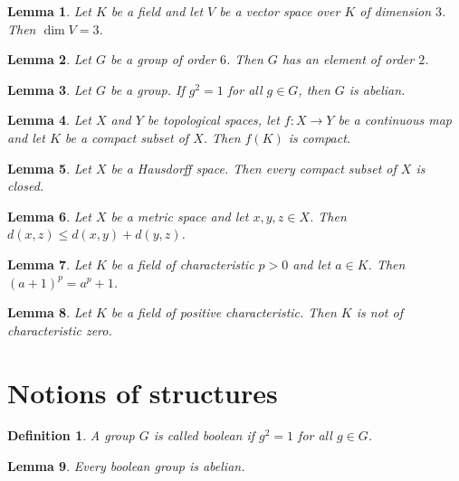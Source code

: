 \documentclass{article}
\newtheorem{lemma}{Lemma}
\newtheorem{definition}{Definition}
\begin{document}
\begin{lemma}\label{dimension}
Let $K$ be a field and let $V$ be a vector space over $K$ of dimension $3$. Then $\dim V=3$.
\end{lemma}

\begin{lemma}\label{element-of-order-two}
Let $G$ be a group of order $6$. Then $G$ has an element of order $2$.
\end{lemma}

\begin{lemma}\label{exponent-two}
Let $G$ be a group. If $g^2=1$ for all $g\in G$, then $G$ is abelian.
\end{lemma}

\begin{lemma}\label{compact-image}
Let $X$ and $Y$ be topological spaces, let $f\colon X\to Y$ be a continuous map and let $K$ be a compact subset of $X$. Then $f(K)$ is compact.
\end{lemma}

\begin{lemma}\label{hausdorff-compact}
Let $X$ be a Hausdorff space. Then every compact subset of $X$ is closed.
\end{lemma}

\begin{lemma}\label{triangle}
Let $X$ be a metric space and let $x,y,z\in X$. Then $d(x,z)\le d(x,y)+d(y,z)$.
\end{lemma}

\begin{lemma}\label{freshman}
Let $K$ be a field of characteristic $p>0$ and let $a\in K$. Then $(a+1)^p=a^p+1$.
\end{lemma}

\begin{lemma}\label{positive-characteristic}
Let $K$ be a field of positive characteristic. Then $K$ is not of characteristic zero.
\end{lemma}

\section{Notions of structures}

\begin{definition}\label{boolean}
A group $G$ is called \emph{boolean} if $g^2=1$ for all $g\in G$.
\end{definition}

\begin{lemma}\label{boolean-abelian}
Every boolean group is abelian.
\end{lemma}
\end{document}
